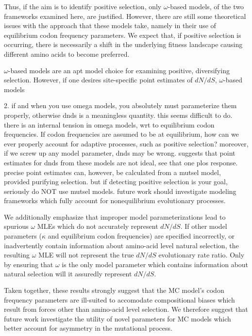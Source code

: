\documentclass{pnastwo}
\begin{document}
\begin{article}
Thus, if the aim is to identify positive selection, only $\omega$-based models, of the two frameworks examined here, are justified. However, there are still some theoretical issues with the approach that these models take, namely in their use of equilibrium codon frequency parameters. We expect that, if positive selection is occurring, there is necessarily a shift in the underlying fitness landscape causing different amino acids to become preferred. 





$\omega$-based models are an apt model choice for examining positive, diversifying selection. However, if one desires site-specific point estimates of $dN/dS$, $\omega$-based models   

 
2. if and when you use omega models, you absolutely must parameterize them properly, otherwise dnds is a meaningless quantity. this seems difficult to do. there is an internal tension in omega models, wrt to equilibrium codon frequencies. If codon frequencies are assumed to be at equilibrium, how can we ever properly account for adaptive processes, such as positive selection? moreover, if we screw up any model parameter, dnds may be wrong. suggests that point estimates for dnds from these models are not ideal, see that one plos response. precise point estimates can, however, be calculated from a mutsel model, provided purifying selection. but if detecting positive selection is your goal, seriously do NOT use mutsel models. future work should investigate modeling frameworks which fully account for nonequilibrium evolutionary processes.

We additionally emphasize that improper model parameterizations lead to spurious $\omega$ MLEs which do not accurately represent $dN/dS$. If other model parameters ($\kappa$ and equilibrium codon frequencies) are specified incorrectly, or inadvertently contain information about amino-acid level natural selection, the resulting $\omega$ MLE will not represent the true $dN/dS$ evolutionary rate ratio. Only by ensuring that $\omega$ is the only model parameter which contains information about natural selection will it assuredly represent $dN/dS$. 
		
		Taken together, these results strongly suggest that the MC model's codon frequency parameters are ill-suited to accomodate compositional biases which result from forces other than amino-acid level selection. We therefore suggest that future work investigate the utility of novel parameters for MC models which better account for asymmetry in the mutational process.
		


\end{article}
\end{document}

